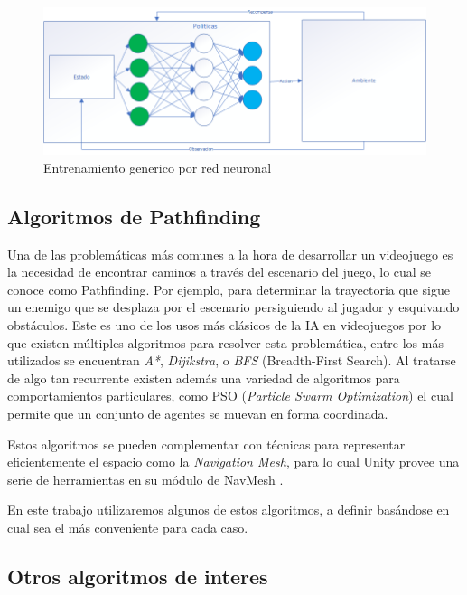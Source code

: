 \documentclass[a4paper]{article}
\begin{document}
\begin{figure}[ht]
    \centering
    \includegraphics[width=1\textwidth]{./images/deep-learning.png}
    \caption{Entrenamiento generico por red neuronal}
    \label{fig:ml}
\end{figure}


\subsection{Algoritmos de Pathfinding}

Una de las problemáticas más comunes a la hora de desarrollar un videojuego es la necesidad de encontrar caminos a través del escenario del juego, lo cual se conoce como Pathfinding. Por ejemplo, para determinar la trayectoria que sigue un enemigo que se desplaza por el escenario persiguiendo al jugador y esquivando obstáculos. Este es uno de los usos más clásicos de la IA en videojuegos por lo que existen múltiples algoritmos para resolver esta problemática, entre los más utilizados se encuentran \textit{A*}, \textit{Dijikstra}, o \textit{BFS} (Breadth-First Search). Al tratarse de algo tan recurrente existen además una variedad de algoritmos para comportamientos particulares, como PSO (\textit{Particle Swarm Optimization}) el cual permite que un conjunto de agentes se muevan en forma coordinada.

Estos algoritmos se pueden complementar con técnicas para representar eficientemente el espacio como la \textit{Navigation Mesh}, para lo cual Unity provee una serie de herramientas en su módulo de NavMesh \cite{unity_artificial_intelligence_programming}.

En este trabajo utilizaremos algunos de estos algoritmos, a definir basándose en cual sea el más conveniente para cada caso.

\subsection{Otros algoritmos de interes}
\end{document}

